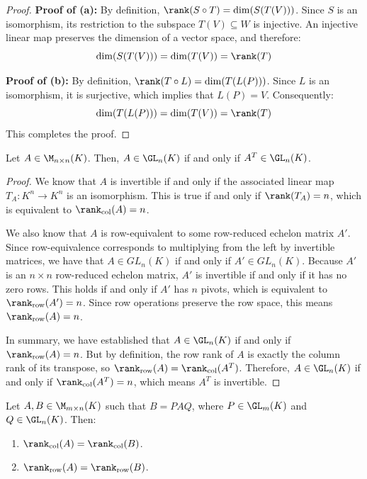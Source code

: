 \begin{proof}
\textbf{Proof of (a):} By definition, $\rank(S \circ T) = \dim (S(T(V)))$. Since $S$ is an isomorphism, its restriction to the subspace $T(V) \subseteq W$ is injective. An injective linear map preserves the dimension of a vector space, and therefore:
\begin{equation*}
    \dim (S(T(V))) = \dim (T(V)) = \rank(T)
\end{equation*}

\textbf{Proof of (b):} By definition, $\rank(T \circ L) = \dim (T(L(P)))$. Since $L$ is an isomorphism, it is surjective, which implies that $L(P) = V$. Consequently:
\begin{equation*}
    \dim (T(L(P))) = \dim (T(V)) = \rank(T)
\end{equation*}
This completes the proof.
\end{proof}

\begin{lemma}
\label{lemma:transpose_invertibility}
Let $A \in \M_{n \times n}(K)$. Then, $A \in \GL_n(K)$ if and only if $A^T \in \GL_n(K)$.
\end{lemma}

\begin{proof}
We know that $A$ is invertible if and only if the associated linear map $T_A: K^n \to K^n$ is an isomorphism. This is true if and only if $\rank(T_A) = n$, which is equivalent to $\rank_{\text{col}}(A) = n$.

We also know that $A$ is row-equivalent to some row-reduced echelon matrix $A'$. Since row-equivalence corresponds to multiplying from the left by invertible matrices, we have that $A \in GL_n(K)$ if and only if $A' \in GL_n(K)$. Because $A'$ is an $n \times n$ row-reduced echelon matrix, $A'$ is invertible if and only if it has no zero rows. This holds if and only if $A'$ has $n$ pivots, which is equivalent to $\rank_{\text{row}}(A') = n$. Since row operations preserve the row space, this means $\rank_{\text{row}}(A) = n$.

In summary, we have established that $A \in \GL_n(K)$ if and only if $\rank_{\text{row}}(A) = n$. But by definition, the row rank of $A$ is exactly the column rank of its transpose, so $\rank_{\text{row}}(A) = \rank_{\text{col}}(A^T)$. Therefore, $A \in \GL_n(K)$ if and only if $\rank_{\text{col}}(A^T) = n$, which means $A^T$ is invertible.
\end{proof}

\begin{lemma}
\label{lemma:rank_invariance_equivalence}
Let $A, B \in \M_{m \times n}(K)$ such that $B = P A Q$, where $P \in \GL_m(K)$ and $Q \in \GL_n(K)$. Then:
\begin{enumerate}
    \item $\rank_{\text{col}}(A) = \rank_{\text{col}}(B)$.
    \item $\rank_{\text{row}}(A) = \rank_{\text{row}}(B)$.
\end{enumerate}
\end{lemma}

